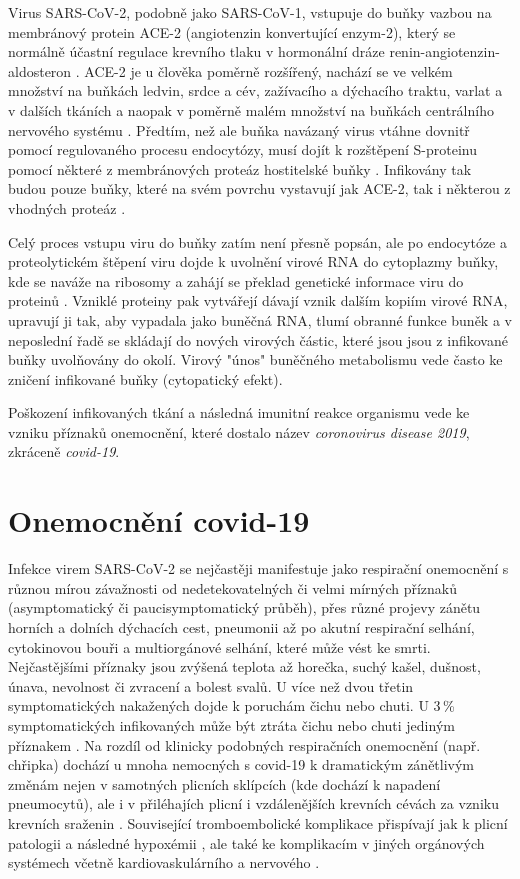 Virus SARS-CoV-2, podobně jako SARS-CoV-1, vstupuje do buňky vazbou na membránový protein ACE-2 (angiotenzin konvertující enzym-2), který se normálně účastní regulace krevního tlaku v hormonální dráze renin-angiotenzin-aldosteron \cite{Li:2017}. ACE-2 je u člověka poměrně rozšířený, nachází se ve velkém množství na buňkách ledvin, srdce a cév, zažívacího a dýchacího traktu, varlat a v dalších tkáních a naopak v poměrně malém množství na buňkách centrálního nervového systému \cite{Harmer:2002}. Předtím, než ale buňka navázaný virus vtáhne dovnitř pomocí regulovaného procesu endocytózy, musí dojít k rozštěpení S-proteinu pomocí některé z membránových proteáz hostitelské buňky \cite{Hoffmann:2020}. Infikovány tak budou pouze buňky, které na svém povrchu vystavují jak ACE-2, tak i některou z vhodných proteáz \cite{Murgolo:2021}.

Celý proces vstupu viru do buňky zatím není přesně popsán, ale po endocytóze a proteolytickém štěpení viru dojde k uvolnění virové RNA do cytoplazmy buňky, kde se naváže na ribosomy a zahájí se překlad genetické informace viru do proteinů \cite{Khan:2020}. Vzniklé proteiny pak vytvářejí dávají vznik dalším kopiím virové RNA, upravují ji tak, aby vypadala jako buněčná RNA, tlumí obranné funkce buněk a v neposlední řadě se skládají do nových virových částic, které jsou jsou z infikované buňky uvolňovány do okolí. Virový "únos" buněčného metabolismu vede často ke zničení infikované buňky (cytopatický efekt).

Poškození infikovaných tkání a následná imunitní reakce organismu vede ke vzniku příznaků onemocnění, které dostalo název \textit{coronovirus disease 2019}, zkráceně \textit{covid-19}.

\section*{Onemocnění covid-19}

Infekce virem SARS-CoV-2 se nejčastěji manifestuje jako respirační onemocnění s různou mírou závažnosti od nedetekovatelných či velmi mírných příznaků (asymptomatický či paucisymptomatický průběh), přes různé projevy zánětu horních a dolních dýchacích cest, pneumonii až po akutní respirační selhání, cytokinovou bouři a multiorgánové selhání, které může vést ke smrti. Nejčastějšími příznaky jsou zvýšená teplota až horečka, suchý kašel, dušnost, únava, nevolnost či zvracení a bolest svalů. U více než dvou třetin symptomatických nakažených dojde k poruchám čichu nebo chuti. U 3\,\% symptomatických infikovaných může být ztráta čichu nebo chuti jediným příznakem \cite{Xie:2020,Wiersinga:2020}. Na rozdíl od klinicky podobných respiračních onemocnění (např. chřipka) dochází u mnoha nemocných s covid-19 k dramatickým zánětlivým změnám nejen v samotných plicních sklípcích (kde dochází k napadení pneumocytů), ale i v přiléhajích plicní i vzdálenějších krevních cévách za vzniku krevních sraženin \cite{Ackermann:2020}. Související tromboembolické komplikace přispívají jak k plicní patologii a následné hypoxémii \cite{McGonagle:2021}, ale také ke komplikacím v jiných orgánových systémech včetně kardiovaskulárního a nervového \cite{Gupta:2020}.

